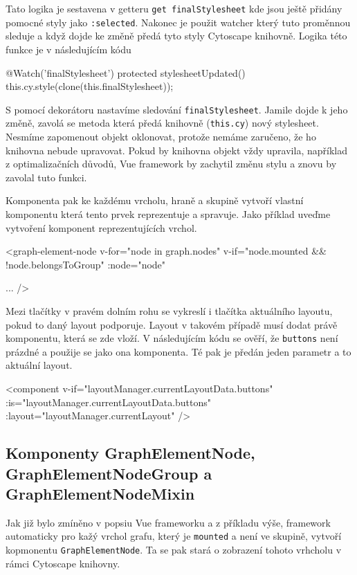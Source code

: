 Tato logika je sestavena v getteru \texttt{get finalStylesheet} kde jsou ještě přidány pomocné styly jako \texttt{:selected}. Nakonec je použit watcher který tuto proměnnou sleduje a když dojde ke změně předá tyto styly Cytoscape knihovně. Logika této funkce je v následujícím kódu
\begin{code}
@Watch('finalStylesheet')
protected stylesheetUpdated() {
    this.cy.style(clone(this.finalStylesheet));
}
\end{code}
S pomocí dekorátoru nastavíme sledování \texttt{finalStylesheet}. Jamile dojde k jeho změně, zavolá se metoda která předá knihovně (\texttt{this.cy}) nový stylesheet. Nesmíme zapomenout objekt oklonovat, protože nemáme zaručeno, že ho knihovna nebude upravovat. Pokud by knihovna objekt vždy upravila, například z optimalizačních důvodů, Vue framework by zachytil změnu stylu a znovu by zavolal tuto funkci.

\newpage
Komponenta pak ke každému vrcholu, hraně a skupině vytvoří vlastní komponentu která tento prvek reprezentuje a spravuje. Jako příklad uveďme vytvoření komponent reprezentujících vrchol.

\begin{code}
<graph-element-node
  v-for="node in graph.nodes"
  v-if="node.mounted && !node.belongsToGroup"
  :node="node"

  ...
/>
\end{code}

\bigskip

Mezi tlačítky v pravém dolním rohu se vykreslí i tlačítka aktuálního layoutu, pokud to daný layout podporuje. Layout v takovém případě musí dodat právě komponentu, která se zde vloží. V následujícím kódu se ověří, že \texttt{buttons} není prázdné a použije se jako ona komponenta. Té pak je předán jeden parametr a to aktuální layout.

\begin{code}
<component
  v-if="layoutManager.currentLayoutData.buttons"
  :is="layoutManager.currentLayoutData.buttons"
  :layout="layoutManager.currentLayout" />
\end{code}

\subsection{Komponenty GraphElementNode, GraphElementNodeGroup a GraphElementNodeMixin}
Jak již bylo zmíněno v popsiu Vue frameworku a z příkladu výše, framework automaticky pro kažý vrchol grafu, který je \texttt{mounted} a není ve skupině, vytvoří kopmonentu \texttt{GraphElementNode}. Ta se pak stará o zobrazení tohoto vrhcholu v rámci Cytoscape knihovny.

